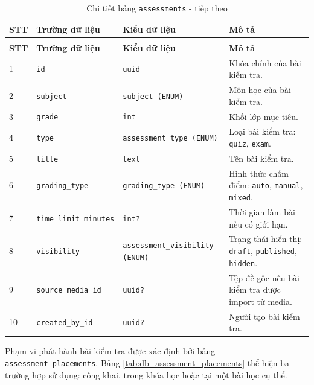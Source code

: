 \documentclass[../DoAn.tex]{subfiles}
\begin{document}
{\begin{longtable}{|p{}|p{}|p{}|p{}|}
\caption{Chi tiết bảng \texttt{assessments}}
\label{tab:db_assessments}\\
\hline
\textbf{STT} & \textbf{Trường dữ liệu} & \textbf{Kiểu dữ liệu} & \textbf{Mô tả} \\ \hline
\endfirsthead
\caption[]{Chi tiết bảng \texttt{assessments} - tiếp theo}\\
\hline
\textbf{STT} & \textbf{Trường dữ liệu} & \textbf{Kiểu dữ liệu} & \textbf{Mô tả} \\ \hline
\endhead
1 & \texttt{id} & \texttt{uuid} & Khóa chính của bài kiểm tra. \\ \hline
2 & \texttt{subject} & \texttt{subject (ENUM)} & Môn học của bài kiểm tra. \\ \hline
3 & \texttt{grade} & \texttt{int} & Khối lớp mục tiêu. \\ \hline
4 & \texttt{type} & \texttt{assessment\_type (ENUM)} & Loại bài kiểm tra: \texttt{quiz}, \texttt{exam}. \\ \hline
5 & \texttt{title} & \texttt{text} & Tên bài kiểm tra. \\ \hline
6 & \texttt{grading\_type} & \texttt{grading\_type (ENUM)} & Hình thức chấm điểm: \texttt{auto}, \texttt{manual}, \texttt{mixed}. \\ \hline
7 & \texttt{time\_limit\_minutes} & \texttt{int?} & Thời gian làm bài nếu có giới hạn. \\ \hline
8 & \texttt{visibility} & \texttt{assessment\_visibility (ENUM)} & Trạng thái hiển thị: \texttt{draft}, \texttt{published}, \texttt{hidden}. \\ \hline
9 & \texttt{source\_media\_id} & \texttt{uuid?} & Tệp đề gốc nếu bài kiểm tra được import từ media. \\ \hline
10 & \texttt{created\_by\_id} & \texttt{uuid?} & Người tạo bài kiểm tra. \\ \hline
\end{longtable}

Phạm vi phát hành bài kiểm tra được xác định bởi bảng \texttt{assessment\_placements}. Bảng \ref{tab:db_assessment_placements} thể hiện ba trường hợp sử dụng: công khai, trong khóa học hoặc tại một bài học cụ thể.

}
\end{document}
